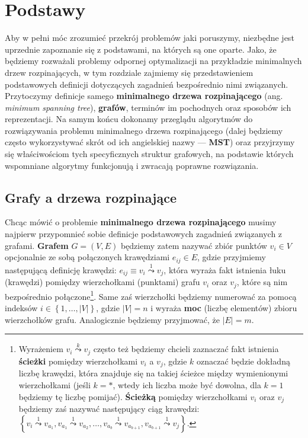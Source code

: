 \chapter{Podstawy}
\thispagestyle{chapterBeginStyle}

Aby w pełni móc zrozumieć przekrój problemów jaki poruszymy, niezbędne jest uprzednie zapoznanie się z podstawami, na których są one oparte. Jako, że będziemy rozważali problemy odpornej optymalizacji na przykładzie minimalnych drzew rozpinających, w tym rozdziale zajmiemy się przedstawieniem podstawowych definicji dotyczących zagadnień bezpośrednio nimi związanych. Przytoczymy definicje samego \textbf{minimalnego drzewa rozpinającego} (ang. \textit{minimum spanning tree}), \textbf{grafów}, terminów im pochodnych oraz sposobów ich reprezentacji. Na samym końcu dokonamy przeglądu algorytmów do rozwiązywania problemu minimalnego drzewa rozpinającego (dalej będziemy często wykorzystywać skrót od ich angielskiej nazwy --- \textbf{MST}) oraz przyjrzymy się właściwościom tych specyficznych struktur grafowych, na podstawie których wspomniane algorytmy funkcjonują i zwracają poprawne rozwiązania.

\section{Grafy a drzewa rozpinające}

Chcąc mówić o problemie \textbf{minimalnego drzewa rozpinającego} musimy najpierw przypomnieć sobie definicje podstawowych zagadnień związanych z grafami. \textbf{Grafem} $G = \left( V, E \right)$ będziemy zatem nazywać zbiór punktów $v_{i} \in V$ opcjonalnie ze sobą połączonych krawędziami $e_{ij} \in E$, gdzie przyjmiemy następującą definicję krawędzi: $e_{ij} \equiv v_{i} \overset{1}{\leadsto} v_{j}$, która wyraża fakt istnienia łuku (krawędzi) pomiędzy wierzchołkami (punktami) grafu $v_{i}$ oraz $v_{j}$, które są nim bezpośrednio połączone\footnote{Wyrażeniem $v_{i} \overset{k}{\leadsto} v_{j}$ często też będziemy chcieli zaznaczać fakt istnienia \textbf{ścieżki} pomiędzy wierzchołkami $v_{i}$ a $v_{j}$, gdzie $k$ oznaczać będzie dokładną liczbę krawędzi, która znajduje się na takiej ścieżce między wymienionymi wierzchołkami (jeśli $k = \ast$, wtedy ich liczba może być dowolna, dla $k = 1$ będziemy tę liczbę pomijać). \textbf{Ścieżką} pomiędzy wierzchołkami $v_{i}$ oraz $v_{j}$ będziemy zaś nazywać następujący ciąg krawędzi: $\left\{ v_{i} \overset{1}{\leadsto} v_{a_{1}}, v_{a_{1}} \overset{1}{\leadsto} v_{a_{2}}, \dots, v_{a_{b}} \overset{1}{\leadsto} v_{a_{b+1}}, v_{a_{b+1}} \overset{1}{\leadsto} v_{j}  \right\}$.}. Same zaś wierzchołki będziemy numerować za pomocą indeksów $i \in \left\{ 1, \dots, \left| V \right| \right\}$, gdzie $\left| V \right| = n$ i wyraża \textbf{moc} (liczbę elementów) zbioru wierzchołków grafu. Analogicznie będziemy przyjmować, że $\left| E \right| = m$. 


